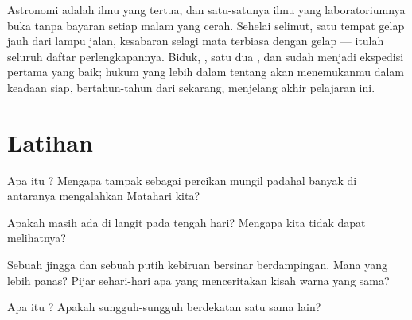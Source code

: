 \begin{remark}\label{rem:g5:stars-night-sky:lookup}
Astronomi adalah ilmu yang tertua, dan satu-satunya ilmu yang
laboratoriumnya buka tanpa bayaran setiap malam yang cerah. Sehelai
selimut, satu tempat gelap jauh dari lampu jalan, kesabaran selagi
mata terbiasa dengan gelap --- itulah seluruh daftar perlengkapannya.
Biduk, , satu dua , dan  sudah menjadi
ekspedisi pertama yang baik; hukum yang lebih dalam tentang 
 akan menemukanmu dalam keadaan siap, bertahun-tahun dari
sekarang, menjelang akhir pelajaran ini.
\end{remark}

\section{Latihan}

\begin{exercise}[$\star$]\label{exo:g5:stars-night-sky:1}
Apa itu ? Mengapa  tampak sebagai percikan mungil
padahal banyak di antaranya mengalahkan  Matahari kita?
\end{exercise}

\begin{exercise}[$\star$]\label{exo:g5:stars-night-sky:2}
Apakah  masih ada di langit pada tengah hari? Mengapa kita
tidak dapat melihatnya?
\end{exercise}

\begin{exercise}[$\star$]\label{exo:g5:stars-night-sky:3}
Sebuah  jingga dan sebuah  putih kebiruan bersinar
berdampingan. Mana yang lebih panas? Pijar sehari-hari apa yang
menceritakan kisah warna yang sama?
\end{exercise}

\begin{exercise}[$\star$]\label{exo:g5:stars-night-sky:4}
Apa itu ? Apakah  sungguh-sungguh berdekatan
satu sama lain?
\end{exercise}

